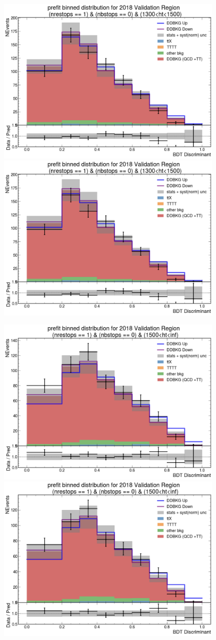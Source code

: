 \documentclass[twoside]{article}
\begin{document}
\begin{figure}[!t]
    \centering
    \includegraphics[width=.45\columnwidth]{plots/Trigger/TriggerReview/eff7.png}
    \includegraphics[width=.45\columnwidth]{plots/Trigger/TriggerReview/SF7.png}

    \includegraphics[width=.45\columnwidth]{plots/Trigger/TriggerReview/eff8.png}
    \includegraphics[width=.45\columnwidth]{plots/Trigger/TriggerReview/SF8.png}


\end{figure}
\end{document}
